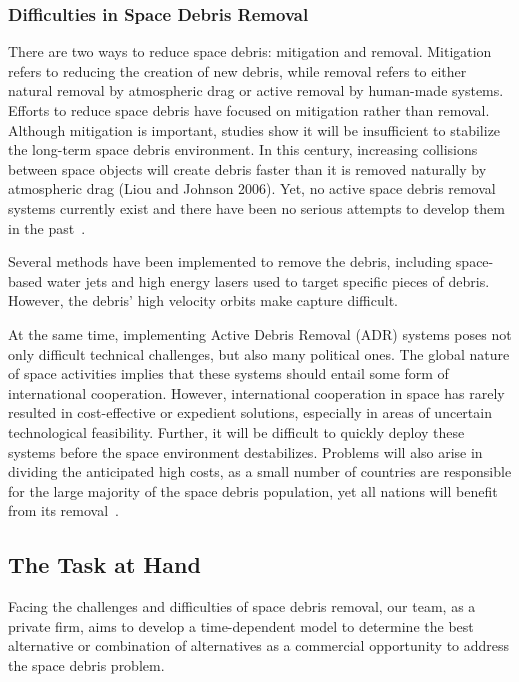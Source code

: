 \documentclass{mcmthesis}
\begin{document}
\subsubsection{Difficulties in Space Debris Removal}
	
	There are two ways to reduce space debris: mitigation and removal. Mitigation refers to reducing the creation of new debris, while removal refers to either natural removal by atmospheric drag or active removal by human-made systems. Efforts to reduce space debris have focused on mitigation rather than removal. Although mitigation is important, studies show it will be insufficient	to stabilize the long-term space debris environment. In this century, increasing collisions between space objects will create debris faster than it is removed naturally by atmospheric drag (Liou and Johnson 2006). Yet, no active space debris removal systems currently exist and there have been no serious attempts to develop them in the past~\cite{Megan}.
	
	Several methods have been implemented to remove the debris, including space-based water jets and high energy lasers used to target specific pieces of debris. However, the debris' high velocity orbits make capture difficult.
	
	At the same time, implementing Active Debris Removal (ADR) systems poses not only difficult technical challenges, but also many political ones. The global nature of space activities implies that these systems should entail some form of international cooperation. However, international cooperation in space has rarely resulted in cost-effective or expedient solutions, especially in areas of uncertain technological feasibility. Further, it will be difficult to quickly deploy these systems before the space environment destabilizes. Problems will also arise in dividing the anticipated high costs, as a small number of countries are responsible for the large majority of the space debris population, yet all nations will benefit from its removal~\cite{Megan}.
	
\subsection{The Task at Hand}\label{Sec-Task}
	
	Facing the challenges and difficulties of space debris removal, our team, as a private firm, aims to develop a time-dependent model to determine the best alternative or combination of alternatives as a commercial opportunity to address the space debris problem.
	
\end{document}
